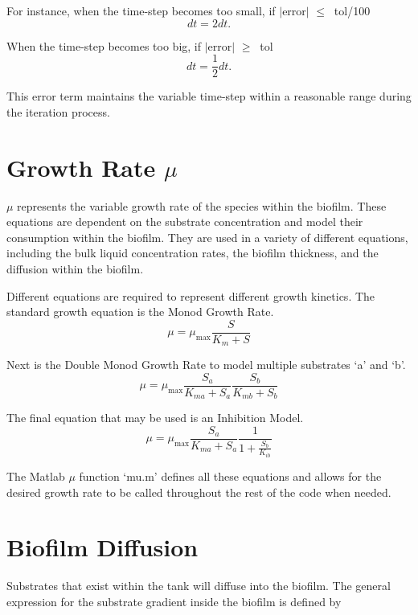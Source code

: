 \documentclass[letterpaper, twoside]{article}
\numberwithin{equation}{section}
\begin{document}
For instance, when the time-step becomes too small, if $|$error$|$ $ \leq\ $ tol/100
\begin{equation}
  dt = 2 dt.
\end{equation}

When the time-step becomes too big, if $|$error$|$ $ \geq\ $ tol
\begin{equation}
  dt = \frac{1}{2} dt.
\end{equation}

This error term maintains the variable time-step within a reasonable range during the iteration process.

\section{Growth Rate $\mu$}\label{sec:mu}
$\mu$ represents the variable growth rate of the species within the biofilm. These equations are dependent on the substrate concentration and model their consumption within the biofilm. They are used in a variety of different equations, including the bulk liquid concentration rates, the biofilm thickness, and the diffusion within the biofilm.

Different equations are required to represent different growth kinetics. The standard growth equation is the Monod Growth Rate.
\begin{equation} \label{eq: MonodGrowthRate}
  \mu=\mu_\mathrm{max} \frac{S}{K_m + S}
\end{equation}

Next is the Double Monod Growth Rate to model multiple substrates `a' and `b'.
\begin{equation} \label{eq: DoubleMonodGrowthRate}
  \mu=\mu_\mathrm{max} \frac{S_a}{K_{ma} + S_a} \frac{S_b}{K_{mb} + S_b}
\end{equation}

The final equation that may be used is an Inhibition Model.
\begin{equation} \label{eq: Inhibition}
  \mu=\mu_\mathrm{max} \frac{S_a}{K_{ma} + S_a} \frac{1}{1 + \frac{S_b}{K_{ib}}}
\end{equation}

The Matlab $\mu$ function `mu.m' defines all these equations and allows for the desired growth rate to be called throughout the rest of the code when needed.
  

\section{Biofilm Diffusion}
Substrates that exist within the tank will diffuse into the biofilm. The general expression for the substrate gradient inside the biofilm is defined by
\end{document}
